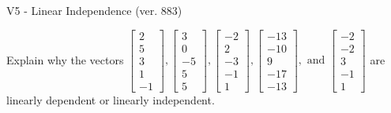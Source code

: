 \begin{exercise}
  \begin{exerciseTitle}V5 - Linear Independence (ver. 883)\end{exerciseTitle}
  \begin{exerciseStatement}
    Explain why the vectors \(\left[\begin{array}{r}
2 \\
5 \\
3 \\
1 \\
-1
\end{array}\right] , \left[\begin{array}{r}
3 \\
0 \\
-5 \\
5 \\
5
\end{array}\right] , \left[\begin{array}{r}
-2 \\
2 \\
-3 \\
-1 \\
1
\end{array}\right] , \left[\begin{array}{r}
-13 \\
-10 \\
9 \\
-17 \\
-13
\end{array}\right] , \text{ and } \left[\begin{array}{r}
-2 \\
-2 \\
3 \\
-1 \\
1
\end{array}\right]\) are linearly dependent or linearly independent.	



\end{exerciseStatement}
\end{exercise}
